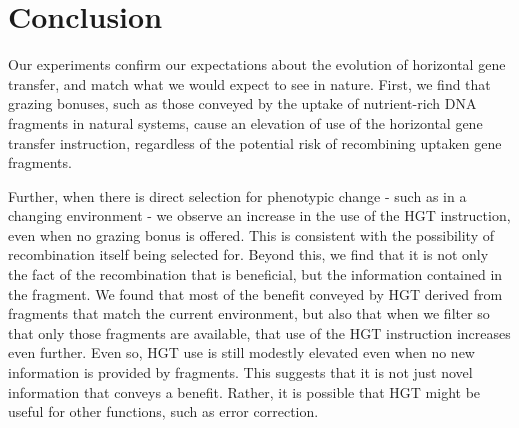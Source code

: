\documentclass[PhD]{msu-thesis}
\begin{document}
	



\section{Conclusion}
Our experiments confirm our expectations about the evolution of horizontal gene transfer, and match what we would expect to see in nature. First, we find that grazing bonuses, such as those conveyed by the uptake of nutrient-rich DNA fragments in natural systems, cause an elevation of use of the horizontal gene transfer instruction, regardless of the potential risk of recombining uptaken gene fragments. 

Further, when there is direct selection for phenotypic change - such as in a changing environment - we observe an increase in the use of the HGT instruction, even when no grazing bonus is offered. This is consistent with the possibility of recombination itself being selected for. Beyond this, we find that it is not only the fact of the recombination that is beneficial, but the information contained in the fragment. We found that 
most of the benefit conveyed by HGT derived from fragments that match the current environment, but also that when we filter so that only those fragments are available, that use of the HGT instruction increases even further. Even so, HGT use is still modestly elevated even when no new information is provided by fragments. This suggests that it is not just novel information that conveys a benefit. Rather, it is possible that HGT might be useful for other functions, such as error correction.
\end{document}
